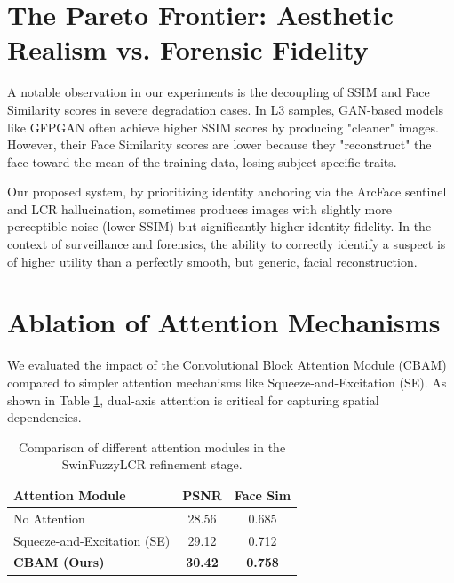 \section{The Pareto Frontier: Aesthetic Realism vs. Forensic Fidelity}
A notable observation in our experiments is the decoupling of SSIM and Face Similarity scores in severe degradation cases. In L3 samples, GAN-based models like GFPGAN often achieve higher SSIM scores by producing "cleaner" images. However, their Face Similarity scores are lower because they "reconstruct" the face toward the mean of the training data, losing subject-specific traits.

Our proposed system, by prioritizing identity anchoring via the ArcFace sentinel and LCR hallucination, sometimes produces images with slightly more perceptible noise (lower SSIM) but significantly higher identity fidelity. In the context of surveillance and forensics, the ability to correctly identify a suspect is of higher utility than a perfectly smooth, but generic, facial reconstruction.

\section{Ablation of Attention Mechanisms}
We evaluated the impact of the Convolutional Block Attention Module (CBAM) compared to simpler attention mechanisms like Squeeze-and-Excitation (SE). As shown in Table \ref{tab:attention_ablation}, dual-axis attention is critical for capturing spatial dependencies.

\begin{table}[h]
    \centering
    \caption{Comparison of different attention modules in the SwinFuzzyLCR refinement stage.}
    \label{tab:attention_ablation}
    \begin{tabular}{lcc}
        \toprule
        \textbf{Attention Module} & \textbf{PSNR} & \textbf{Face Sim} \\
        \midrule
        No Attention & 28.56 & 0.685 \\
        Squeeze-and-Excitation (SE) & 29.12 & 0.712 \\
        \textbf{CBAM (Ours)} & \textbf{30.42} & \textbf{0.758} \\
        \bottomrule
    \end{tabular}
\end{table}
